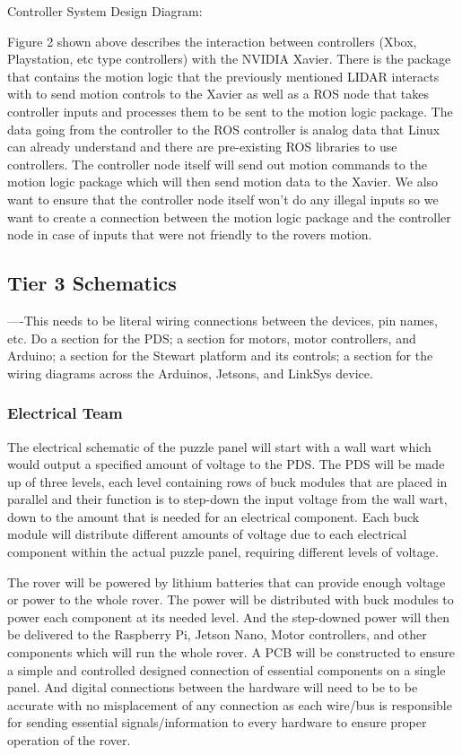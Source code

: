 \documentclass[a4paper, 10pt]{article}
\begin{document}
Controller System Design Diagram:

Figure 2 shown above describes the interaction between controllers (Xbox, Playstation, etc type controllers) with the NVIDIA Xavier. There is the package that contains the motion logic that the previously mentioned LIDAR interacts with to send motion controls to the Xavier as well as a ROS node that takes controller inputs and processes them to be sent to the motion logic package. The data going from the controller to the ROS controller is analog data that Linux can already understand and there are pre-existing ROS libraries to use controllers. The controller node itself will send out motion commands to the motion logic package which will then send motion data to the Xavier. We also want to ensure that the controller node itself won't do any illegal inputs so we want to create a connection between the motion logic package and the controller node in case of inputs that were not friendly to the rovers motion.	
	
	\subsection{Tier 3 Schematics}
	----This needs to be literal wiring connections between the devices, pin names, etc. Do a section for the PDS; a section for motors, motor controllers, and Arduino; a section for the Stewart platform and its controls; a section for the wiring diagrams across the Arduinos, Jetsons, and LinkSys device.
	
	
		\subsubsection{Electrical Team}
		The electrical schematic of the puzzle panel will start with a wall wart which would output a specified amount of voltage to the PDS. The PDS will be made up of three levels, each level containing rows of buck modules that are placed in parallel and their function is to step-down the input voltage from the wall wart, down to the amount that is needed for an electrical component. Each buck module will distribute different amounts of voltage due to each electrical component within the actual puzzle panel, requiring different levels of voltage.

		The rover will be powered by lithium batteries that can provide enough voltage or power to the whole rover. The power will be distributed with buck modules to power each component at its needed level. And the step-downed power will then be delivered to the Raspberry Pi, Jetson Nano, Motor controllers, and other components which will run the whole rover. A PCB will be constructed to ensure a simple and controlled designed connection of essential components on a single panel. And digital connections between the hardware will need to be to be accurate with no misplacement of any connection as each wire/bus is responsible for sending essential signals/information to every hardware to ensure proper operation of the rover.     
\end{document}
